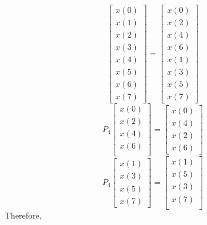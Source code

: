 \documentclass[journal,12pt,twocolumn]{IEEEtran}
\renewcommand\thesection{\arabic{section}}
\begin{document}
\begin{enumerate}[label=\arabic*.,ref=\thesection.\theenumi]
\begin{equation}
\begin{bmatrix}
    x(0) \\ 
    x(1) \\ 
    x(2) \\ 
    x(3) \\ 
    x(4) \\ 
    x(5) \\
    x(6) \\
    x(7)
    \end{bmatrix}
     = 
    \begin{bmatrix}
    x(0) \\ 
    x(2) \\ 
    x(4) \\ 
    x(6) \\
    x(1) \\ 
    x(3) \\ 
    x(5) \\
    x(7)
    \end{bmatrix}\label{P_8}
    \end{equation}
    \begin{equation}
    P_{4}
    \begin{bmatrix}
    x(0) \\ 
    x(2) \\ 
    x(4) \\ 
    x(6) \\
    \end{bmatrix}
     = 
    \begin{bmatrix}
    x(0) \\ 
    x(4) \\ 
    x(2) \\
    x(6)
    \end{bmatrix}\label{P4_1}
    \end{equation}
    \begin{equation}
    P_{4}
    \begin{bmatrix}
    x(1) \\ 
    x(3) \\ 
    x(5) \\
    x(7)
    \end{bmatrix}
     = 
    \begin{bmatrix}
    x(1) \\ 
    x(5) \\ 
    x(3) \\ 
    x(7) \\
    \end{bmatrix}\label{P4_2}
    \end{equation}
    Therefore,
    \begin{equation}

\end{equation}
\end{enumerate}
\end{document}
